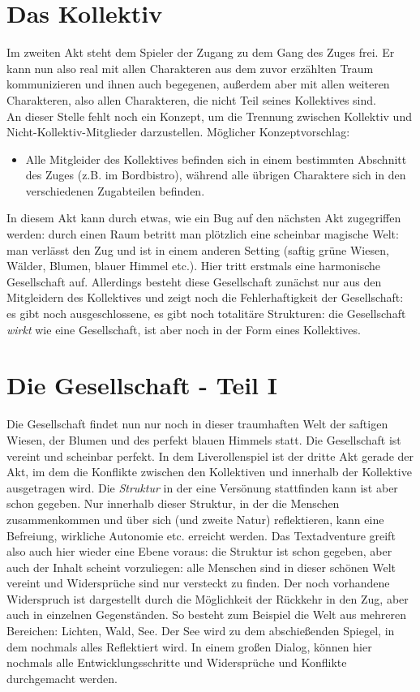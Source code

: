 \documentclass[12pt, a4paper, openany]{report}
\begin{document}
\section{Das Kollektiv} \label{das-kollektiv}
Im zweiten Akt steht dem Spieler der Zugang zu dem Gang des Zuges frei. 
Er kann nun also real mit allen Charakteren aus dem zuvor erzählten Traum kommunizieren und ihnen auch begegenen, außerdem aber mit allen weiteren Charakteren, also allen Charakteren, die nicht Teil seines Kollektives sind. \\
An dieser Stelle fehlt noch ein Konzept, um die Trennung zwischen Kollektiv und Nicht-Kollektiv-Mitglieder darzustellen.
Möglicher Konzeptvorschlag:
\begin{itemize}
\item[] Alle Mitgleider des Kollektives befinden sich in einem bestimmten Abschnitt des Zuges (z.B. im Bordbistro), während alle übrigen Charaktere sich in den verschiedenen Zugabteilen befinden.
\end{itemize}

In diesem Akt kann durch etwas, wie ein Bug auf den nächsten Akt zugegriffen werden: 
durch einen Raum betritt man plötzlich eine scheinbar magische Welt:
man verlässt den Zug und ist in einem anderen Setting (saftig grüne Wiesen, Wälder, Blumen, blauer Himmel etc.).
Hier tritt erstmals eine harmonische Gesellschaft auf. 
Allerdings besteht diese Gesellschaft zunächst nur aus den Mitgleidern des Kollektives und zeigt noch die Fehlerhaftigkeit der Gesellschaft: es gibt noch ausgeschlossene, es gibt noch totalitäre Strukturen: die Gesellschaft \textit{wirkt} wie eine Gesellschaft, ist aber noch in der Form eines Kollektives. 

\section{Die Gesellschaft - Teil I} \label{die-gesellschaft}
Die Gesellschaft findet nun nur noch in dieser traumhaften Welt der saftigen Wiesen, der Blumen und des perfekt blauen Himmels statt. 
Die Gesellschaft ist vereint und scheinbar perfekt. 
In dem Liverollenspiel ist der dritte Akt gerade der Akt, im dem die Konflikte zwischen den Kollektiven und innerhalb der Kollektive ausgetragen wird. 
Die \textit{Struktur} in der eine Versönung stattfinden kann ist aber schon gegeben. 
Nur innerhalb dieser Struktur, in der die Menschen zusammenkommen und über sich (und zweite Natur) reflektieren, kann eine Befreiung, wirkliche Autonomie etc. erreicht werden.
Das Textadventure greift also auch hier wieder eine Ebene voraus: die Struktur ist schon gegeben, aber auch der Inhalt scheint vorzuliegen: alle Menschen sind in dieser schönen Welt vereint und Widersprüche sind nur versteckt zu finden.
Der noch vorhandene Widerspruch ist dargestellt durch die Möglichkeit der Rückkehr in den Zug, aber auch in einzelnen Gegenständen.
So besteht zum Beispiel die Welt aus mehreren Bereichen: Lichten, Wald, See. 
Der See wird zu dem abschießenden Spiegel, in dem nochmals alles Reflektiert wird.
In einem großen Dialog, können hier nochmals alle Entwicklungsschritte und Widersprüche und Konflikte durchgemacht werden.
\end{document}

